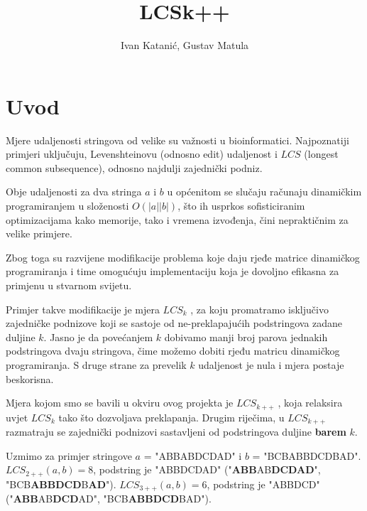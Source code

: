 \documentclass[times, utf8, seminar, numeric]{fer}
\begin{document}
\nocite{*}

\title{LCSk++}

\author{Ivan Katanić, Gustav Matula}


\maketitle

\tableofcontents

\chapter{Uvod}
Mjere udaljenosti stringova od velike su važnosti u bioinformatici.
Najpoznatiji primjeri uključuju, Levenshteinovu (odnosno edit)
udaljenost i $LCS$ (longest common subsequence), odnosno najdulji
zajednički podniz.

Obje udaljenosti za dva stringa $a$ i $b$ u općenitom se slučaju
računaju dinamičkim programiranjem u složenosti $O(|a||b|)$, što ih
usprkos sofisticiranim optimizacijama kako memorije, tako i vremena
izvođenja, čini nepraktičnim za velike primjere.

Zbog toga su razvijene modifikacije problema koje daju rjeđe matrice
dinamičkog programiranja i time omogućuju implementaciju koja je 
dovoljno efikasna za primjenu u stvarnom svijetu.

Primjer takve modifikacije je mjera $LCS_k$ \cite{Benson}, za koju
promatramo isključivo zajedničke podnizove koji se sastoje od
ne-preklapajućih podstringova zadane duljine $k$. Jasno je da
povećanjem $k$ dobivamo manji broj parova jednakih podstringova dvaju
stringova, čime možemo dobiti rjeđu matricu dinamičkog programiranja.
S druge strane za prevelik $k$ udaljenost je nula i mjera
postaje beskorisna.

Mjera kojom smo se bavili u okviru ovog projekta je $LCS_{k++}$
\cite{Pavetic}, koja relaksira uvjet $LCS_k$ tako što dozvoljava
preklapanja. Drugim riječima, u $LCS_{k++}$ razmatraju se zajednički
podnizovi sastavljeni od podstringova duljine \textbf{barem} $k$.

Uzmimo za primjer stringove $a$ = "ABBABDCDAD" i $b$ = "BCBABBDCDBAD".
$LCS_{2++}(a,b) = 8$, podstring je "ABBDCDAD"
("\textbf{ABB}AB\textbf{DCDAD}", "BCB\textbf{ABBDCD}B\textbf{AD}").
$LCS_{3++}(a,b) = 6$, podstring je "ABBDCD"
("\textbf{ABB}AB\textbf{DCD}AD", "BCB\textbf{ABBDCD}BAD").
\end{document}
